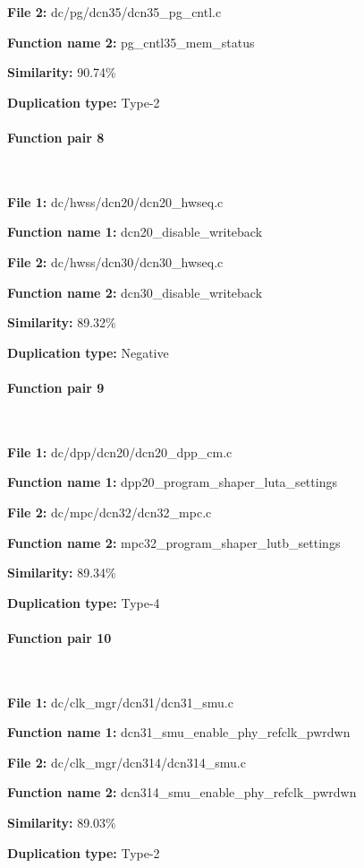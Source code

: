 \textbf{File 2:} dc/pg/dcn35/dcn35\_pg\_cntl.c

\textbf{Function name 2:} pg\_cntl35\_mem\_status

\textbf{Similarity:} 90.74\%

\textbf{Duplication type:} Type-2


\paragraph{Function pair 8 }  

\

\textbf{File 1:} dc/hwss/dcn20/dcn20\_hwseq.c

\textbf{Function name 1:} dcn20\_disable\_writeback

\textbf{File 2:} dc/hwss/dcn30/dcn30\_hwseq.c

\textbf{Function name 2:} dcn30\_disable\_writeback

\textbf{Similarity:} 89.32\%

\textbf{Duplication type:} Negative


\paragraph{Function pair 9 }  

\

\textbf{File 1:} dc/dpp/dcn20/dcn20\_dpp\_cm.c

\textbf{Function name 1:} dpp20\_program\_shaper\_luta\_settings

\textbf{File 2:} dc/mpc/dcn32/dcn32\_mpc.c

\textbf{Function name 2:} mpc32\_program\_shaper\_lutb\_settings

\textbf{Similarity:} 89.34\%

\textbf{Duplication type:} Type-4


\paragraph{Function pair 10 }  

\

\textbf{File 1:} dc/clk\_mgr/dcn31/dcn31\_smu.c

\textbf{Function name 1:} dcn31\_smu\_enable\_phy\_refclk\_pwrdwn

\textbf{File 2:} dc/clk\_mgr/dcn314/dcn314\_smu.c

\textbf{Function name 2:} dcn314\_smu\_enable\_phy\_refclk\_pwrdwn

\textbf{Similarity:} 89.03\%

\textbf{Duplication type:} Type-2



